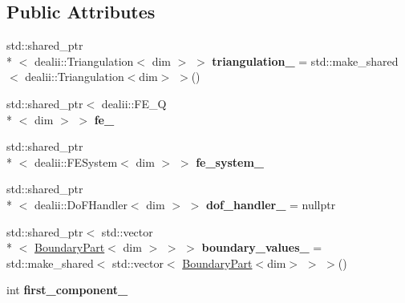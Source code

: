 \subsection*{Public Attributes}
\begin{DoxyCompactItemize}
\item 
\hypertarget{classSpacy_1_1dealII_1_1VectorCreator_afdff8fb5c5eaf08b1da5fad005e0a542}{std\-::shared\-\_\-ptr\\*
$<$ dealii\-::\-Triangulation$<$ dim $>$ $>$ {\bfseries triangulation\-\_\-} = std\-::make\-\_\-shared$<$ dealii\-::\-Triangulation$<$dim$>$ $>$()}\label{classSpacy_1_1dealII_1_1VectorCreator_afdff8fb5c5eaf08b1da5fad005e0a542}

\item 
\hypertarget{classSpacy_1_1dealII_1_1VectorCreator_a9204f6360dc4c7d40502f7d3a0d58905}{std\-::shared\-\_\-ptr$<$ dealii\-::\-F\-E\-\_\-\-Q\\*
$<$ dim $>$ $>$ {\bfseries fe\-\_\-}}\label{classSpacy_1_1dealII_1_1VectorCreator_a9204f6360dc4c7d40502f7d3a0d58905}

\item 
\hypertarget{classSpacy_1_1dealII_1_1VectorCreator_a9b37a1aaf90b0172552d65d1fa6f833c}{std\-::shared\-\_\-ptr\\*
$<$ dealii\-::\-F\-E\-System$<$ dim $>$ $>$ {\bfseries fe\-\_\-system\-\_\-}}\label{classSpacy_1_1dealII_1_1VectorCreator_a9b37a1aaf90b0172552d65d1fa6f833c}

\item 
\hypertarget{classSpacy_1_1dealII_1_1VectorCreator_ac37ae0324517815460d797847bc68abd}{std\-::shared\-\_\-ptr\\*
$<$ dealii\-::\-Do\-F\-Handler$<$ dim $>$ $>$ {\bfseries dof\-\_\-handler\-\_\-} = nullptr}\label{classSpacy_1_1dealII_1_1VectorCreator_ac37ae0324517815460d797847bc68abd}

\item 
\hypertarget{classSpacy_1_1dealII_1_1VectorCreator_ac2e6fcd47513c33808951303f2a90a17}{std\-::shared\-\_\-ptr$<$ std\-::vector\\*
$<$ \hyperlink{structSpacy_1_1dealII_1_1BoundaryPart}{Boundary\-Part}$<$ dim $>$ $>$ $>$ {\bfseries boundary\-\_\-values\-\_\-} = std\-::make\-\_\-shared$<$ std\-::vector$<$ \hyperlink{structSpacy_1_1dealII_1_1BoundaryPart}{Boundary\-Part}$<$dim$>$ $>$ $>$()}\label{classSpacy_1_1dealII_1_1VectorCreator_ac2e6fcd47513c33808951303f2a90a17}

\item 
\hypertarget{classSpacy_1_1dealII_1_1VectorCreator_a90c4f30e4c855a1c1157f1f052e8e1d3}{int {\bfseries first\-\_\-component\-\_\-}}\label{classSpacy_1_1dealII_1_1VectorCreator_a90c4f30e4c855a1c1157f1f052e8e1d3}

\end{DoxyCompactItemize}


